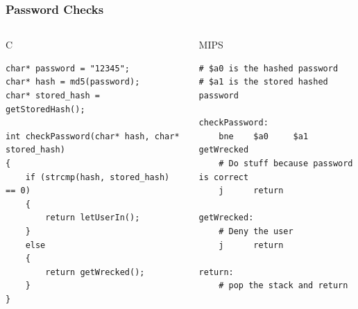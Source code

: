 \documentclass{beamer}
\begin{document}
\begin{frame}[fragile]
\frametitle{Password Checks}{\vspace{-3em}}
\begin{columns}[t]
\begin{column}{0.5\textwidth}
\begin{center}C\end{center}
\begin{lstlisting}
char* password = "12345";
char* hash = md5(password);
char* stored_hash = getStoredHash();

int checkPassword(char* hash, char* stored_hash)
{
    if (strcmp(hash, stored_hash) == 0)
    {
        return letUserIn();
    }
    else
    {
        return getWrecked();
    }
}
\end{lstlisting}
\end{column}

\begin{column}{0.5\textwidth}
\begin{center}MIPS\end{center}
\begin{lstlisting}[language={}]
# $a0 is the hashed password
# $a1 is the stored hashed password

checkPassword:
    bne    $a0     $a1    getWrecked
    # Do stuff because password is correct
    j      return

getWrecked:
    # Deny the user
    j      return

return:
    # pop the stack and return
\end{lstlisting}
\end{column}

\end{columns}
\end{frame}
\end{document}
